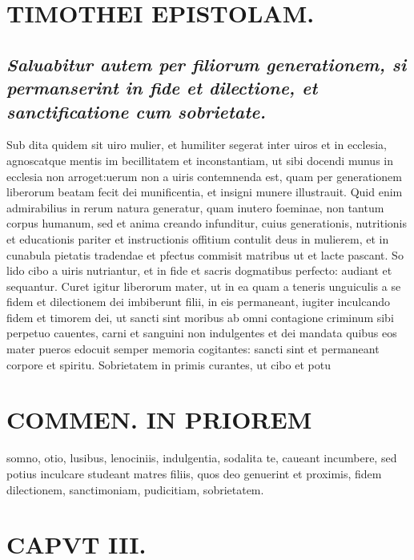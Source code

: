 \documentclass{article}
\begin{document}
\begin{pages}
\section*{TIMOTHEI EPISTOLAM. }
\marginpar{[ p.63 ]}
{}
\subsection*{\textit{Saluabitur autem per filiorum generationem, si permanserint in fide et dilectione, et sanctificatione cum sobrietate. }}\pstart Sub dita quidem sit uiro mulier, et humiliter segerat inter uiros et in ecclesia, agnoscatque mentis im becillitatem et inconstantiam, ut sibi docendi munus in ecclesia non arroget:uerum non a uiris contemnenda est, quam per generationem liberorum beatam fecit dei munificentia, et insigni munere illustrauit. Quid enim admirabilius in rerum natura generatur, quam inutero foeminae, non tantum corpus humanum, sed et anima creando infunditur, cuius generationis, nutritionis et educationis pariter et instructionis offitium contulit deus in mulierem, et in cunabula pietatis tradendae et pfectus commisit matribus ut et lacte pascant. So lido cibo a uiris nutriantur, et in fide et sacris dogmatibus perfecto: audiant et sequantur. Curet igitur liberorum mater, ut in ea quam a teneris unguiculis a se fidem et dilectionem dei imbiberunt filii, in eis permaneant, iugiter inculcando fidem et timorem dei, ut sancti sint moribus ab omni contagione criminum sibi perpetuo cauentes, carni et sanguini non indulgentes et dei mandata quibus eos mater pueros edocuit semper memoria cogitantes: sancti sint et permaneant corpore et spiritu. Sobrietatem in primis curantes, ut cibo et potu  \pend
\section*{COMMEN. IN PRIOREM }
\marginpar{[ p.64 ]}\pstart somno, otio, lusibus, lenociniis, indulgentia, sodalita te, caueant incumbere, sed potius inculcare studeant matres filiis, quos deo genuerint et proximis, fidem dilectionem, sanctimoniam, pudicitiam, sobrietatem.  \pend
\endnumbering\beginnumbering\section{CAPVT III.}
{}

\end{pages}
\end{document}
